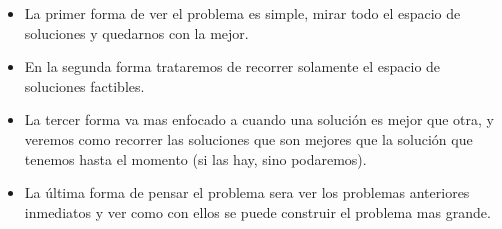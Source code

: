 \begin{itemize}
\item La primer forma de ver el problema es simple, mirar todo el espacio de soluciones y quedarnos con la mejor.\\
\item En la segunda forma trataremos de recorrer solamente el espacio de soluciones factibles.\\
\item La tercer forma va mas enfocado a cuando una soluci\'on es mejor que otra, y veremos como recorrer las soluciones que son mejores que la soluci\'on que tenemos hasta el momento (si las hay, sino podaremos).\\
\item La \'ultima forma de pensar el problema sera ver los problemas anteriores inmediatos y ver como con ellos se puede construir el problema mas grande.
\end{itemize}